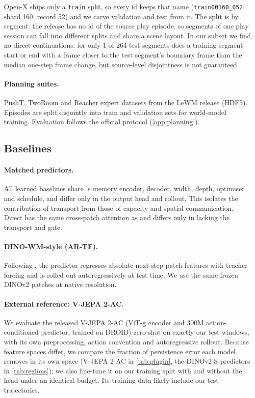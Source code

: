 Open-X ships only a
\texttt{train} split, so every id keeps that name (\texttt{train00160\_052}: shard 160, record 52) and we carve
validation and test from it. The split is by segment: the release has no id of the source play episode, so segments
of one play session can fall into different splits and share a scene layout. In our subset we find no direct
continuations: for only 1 of 264 test segments does a training segment start or end with a frame closer to the test
segment's boundary frame than the median one-step frame change,
but source-level disjointness is not guaranteed.
\paragraph{Planning suites.} PushT, TwoRoom and Reacher expert datasets from the LeWM release
(HDF5). Episodes are split disjointly into train and validation sets for world-model training.
Evaluation follows the official protocol (\cref{app:planning}).

\FloatBarrier
\subsection{Baselines}\label{app:baselines}
\paragraph{Matched predictors.} All learned baselines share \ours{}'s memory encoder, decoder, width,
depth, optimiser and schedule, and differ only in the output head and rollout. This isolates the
contribution of transport from those of capacity and spatial communication. Direct has the same
cross-patch attention as \ours{} and differs only in lacking the transport and gate.
\paragraph{DINO-WM-style (AR-TF).} Following \citet{zhou2025dinowm}, the predictor regresses absolute
next-step patch features with teacher forcing and is rolled out autoregressively at test time. We
use the same frozen DINOv2 patches at native resolution.
\paragraph{External reference: V-JEPA 2-AC.} We evaluate the released V-JEPA 2-AC \citep{assran2025vjepa2}
(ViT-g encoder and 300M action-conditioned predictor, trained on DROID) zero-shot on exactly our test windows, with its own
preprocessing, action convention and autoregressive rollout. Because feature spaces differ, we compare the fraction of
persistence error each model removes in its own space (V-JEPA 2-AC in \cref{tab:plugin}, the DINOv2-S predictors in \cref{tab:regions}); we also fine-tune it on our training split with
and without the \ours{} head under an identical budget. Its training data likely include our test trajectories.

